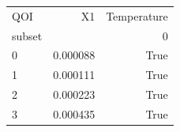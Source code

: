 \begin{tabular}{lrr}
\toprule
QOI & X1 & Temperature \\
subset &  & 0 \\
\midrule
0 & 0.000088 & True \\
1 & 0.000111 & True \\
2 & 0.000223 & True \\
3 & 0.000435 & True \\
\bottomrule
\end{tabular}
